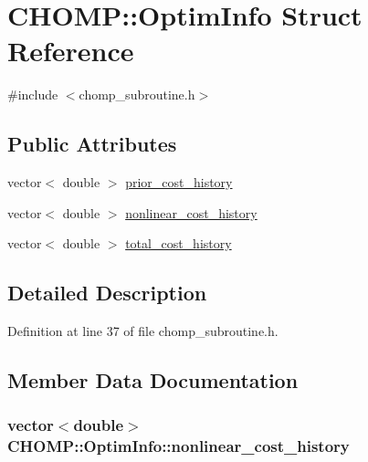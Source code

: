 \hypertarget{struct_c_h_o_m_p_1_1_optim_info}{}\section{C\+H\+O\+MP\+:\+:Optim\+Info Struct Reference}
\label{struct_c_h_o_m_p_1_1_optim_info}


{\ttfamily \#include $<$chomp\+\_\+subroutine.\+h$>$}

\subsection*{Public Attributes}
\begin{DoxyCompactItemize}
\item 
vector$<$ double $>$ \hyperlink{struct_c_h_o_m_p_1_1_optim_info_af3837487472aa772f6aeace2c32f356a}{prior\+\_\+cost\+\_\+history}
\item 
vector$<$ double $>$ \hyperlink{struct_c_h_o_m_p_1_1_optim_info_a80f485a174b1213d23e2c378ebcbafe2}{nonlinear\+\_\+cost\+\_\+history}
\item 
vector$<$ double $>$ \hyperlink{struct_c_h_o_m_p_1_1_optim_info_a47f69044821c9ff79aabd1acb5424926}{total\+\_\+cost\+\_\+history}
\end{DoxyCompactItemize}


\subsection{Detailed Description}


Definition at line 37 of file chomp\+\_\+subroutine.\+h.



\subsection{Member Data Documentation}
\subsubsection[{\texorpdfstring{nonlinear\+\_\+cost\+\_\+history}{nonlinear_cost_history}}]{\setlength{\rightskip}{0pt plus 5cm}vector$<$double$>$ C\+H\+O\+M\+P\+::\+Optim\+Info\+::nonlinear\+\_\+cost\+\_\+history}\hypertarget{struct_c_h_o_m_p_1_1_optim_info_a80f485a174b1213d23e2c378ebcbafe2}{}\label{struct_c_h_o_m_p_1_1_optim_info_a80f485a174b1213d23e2c378ebcbafe2}


